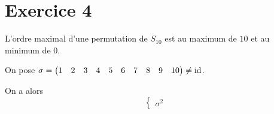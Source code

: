 \part{Exercice 4}

L'ordre maximal d'une permutation de $S_{10}$ est au maximum de $10$ et au minimum de $0$.

On pose $\sigma = \begin{pmatrix}
	1&2&3&4&5&6&7&8&9&10
\end{pmatrix} \neq \operatorname{id}$.

On a alors \[
	\begin{cases}
		\sigma^2
	\end{cases}
\] 
